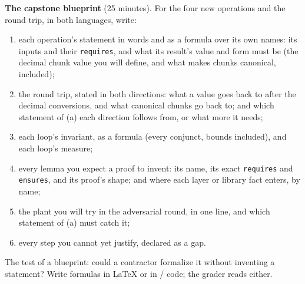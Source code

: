 \documentclass[11pt]{article}
\begin{document}
\begin{problem}\label{prob:B1}
\textbf{The capstone blueprint} (25 minutes). For the four new operations
and the round trip, in both languages, write:
\begin{enumerate}
\item[(a)] each operation's statement in words and as a formula over its own
  names: its inputs and their \texttt{requires}, and what its result's value
  and form must be (the decimal chunk value you will define, and what makes
  chunks canonical, included);
\item[(b)] the round trip, stated in both directions: what a value goes back
  to after the decimal conversions, and what canonical chunks go back to;
  and which statement of (a) each direction follows from, or what more it
  needs;
\item[(c)] each loop's invariant, as a formula (every conjunct, bounds
  included), and each loop's measure;
\item[(d)] every lemma you expect a proof to invent: its name, its exact
  \texttt{requires} and \texttt{ensures}, and its proof's shape; and where
  each layer or library fact enters, by name;
\item[(e)] the plant you will try in the adversarial round, in one line, and
  which statement of (a) must catch it;
\item[(f)] every step you cannot yet justify, declared as a gap.
\end{enumerate}
The test of a blueprint: could a contractor formalize it without inventing a
statement? Write formulas in \LaTeX{} or in / code; the
grader reads either.
\end{problem}
\end{document}
